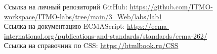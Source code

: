 \begin{thebibliography}{}
     Cсылка на личный репозиторий GitHub: \url{https://github.com/ITMO-workspace/ITMO-labs/tree/main/3_Web/labs/lab1}\\
     Ссылка на документацию ECMAScript: \url{https://ecma-international.org/publications-and-standards/standards/ecma-262/}\\
     Ссылка на справочник по CSS: \url{https://htmlbook.ru/CSS}\\
\end{thebibliography}